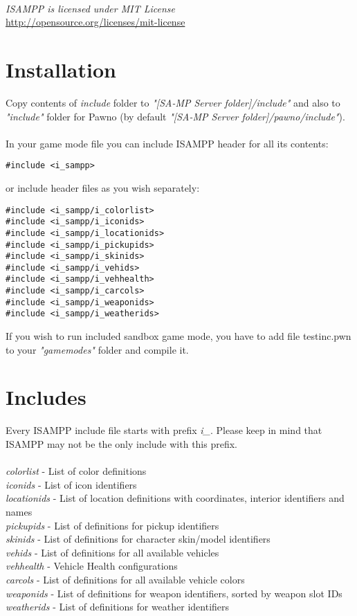 \documentclass{article}
\begin{document}
\textit{\\ISAMPP is licensed under MIT License} \\\url{http://opensource.org/licenses/mit-license}

\section{Installation}
Copy contents of \textit{include} folder to \textit{"[SA-MP Server folder]/include"} and also to \textit{"include"} folder for Pawno (by default \textit{"[SA-MP Server folder]/pawno/include"}).
\\
\\
In your game mode file you can include ISAMPP header for all its contents:
\begin{verbatim}
#include <i_sampp>
\end{verbatim}
or include header files as you wish separately:
\begin{verbatim}
#include <i_sampp/i_colorlist>
#include <i_sampp/i_iconids>
#include <i_sampp/i_locationids>
#include <i_sampp/i_pickupids>
#include <i_sampp/i_skinids>
#include <i_sampp/i_vehids>
#include <i_sampp/i_vehhealth>
#include <i_sampp/i_carcols>
#include <i_sampp/i_weaponids>
#include <i_sampp/i_weatherids>
\end{verbatim}
If you wish to run included sandbox game mode, you have to add file testinc.pwn to your \textit{"gamemodes"} folder and compile it.

\newpage
\section{Includes}
Every ISAMPP include file starts with prefix \textit{i\_}. Please keep in mind that ISAMPP may not be the only include with this prefix.
\\
\\
\textit{colorlist} - List of color definitions
\\
\textit{iconids} - List of icon identifiers
\\
\textit{locationids} - List of location definitions with coordinates, interior identifiers and names
\\
\textit{pickupids} - List of definitions for pickup identifiers
\\
\textit{skinids} - List of definitions for character skin/model identifiers
\\
\textit{vehids} - List of definitions for all available vehicles
\\
\textit{vehhealth} - Vehicle Health configurations
\\
\textit{carcols} - List of definitions for all available vehicle colors
\\
\textit{weaponids} - List of definitions for weapon identifiers, sorted by weapon slot IDs
\\
\textit{weatherids} - List of definitions for weather identifiers
\end{document}
